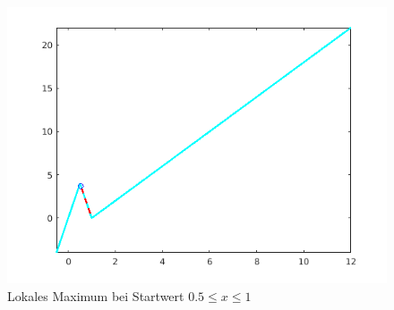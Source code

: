 \documentclass{hbrs-ecta-report}
\begin{document}
\begin{figure}[t]
	\includegraphics[width=\linewidth]{img/plot_fit_local_max_right.png}
	\caption{Lokales Maximum bei Startwert  $0.5 \leq x\leq1$ }
	\label{fig:fit_local_max_right} 
\end{figure}
\end{document}
